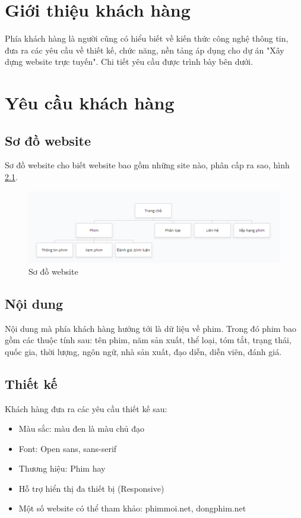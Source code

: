 \documentclass[a4paper]{book}
\begin{document}
\chapter{Giới thiệu khách hàng}
Phía khách hàng là người cũng có hiểu biết về kiến thức công nghệ thông tin, đưa ra các yêu cầu về thiết kế, chức năng, nền tảng áp dụng cho dự án "Xây dựng website trực tuyến". Chi tiết yêu cầu được trình bày bên dưới.
\chapter{Yêu cầu khách hàng}
\section{Sơ đồ website}
Sơ đồ website cho biết website bao gồm những site nào, phân cấp ra sao, hình \ref{fig:so_do_website}.
\begin{figure}[h!]
	\centering
	\includegraphics[width=\textwidth]{sodo_website.PNG}
	\caption{Sơ đồ website}
	\label{fig:so_do_website}
\end{figure}
\section{Nội dung}
Nội dung mà phía khách hàng hướng tới là dữ liệu về phim. Trong đó phim bao gồm các thuộc tính sau: tên phim, năm sản xuất, thể loại, tóm tắt, trạng thái, quốc gia, thời lượng, ngôn ngữ, nhà sản xuất, đạo diễn, diễn viên, đánh giá.
\section{Thiết kế}
Khách hàng đưa ra các yêu cầu thiết kế sau:
\begin{itemize}
	\item Màu sắc: màu đen là màu chủ đạo
	\item Font: Open sans, sans-serif
	\item Thương hiệu: Phim hay
	\item Hỗ trợ hiển thị đa thiết bị (Responsive)
	\item Một số website có thể tham khảo: phimmoi.net, dongphim.net
\end{itemize}
\end{document}
